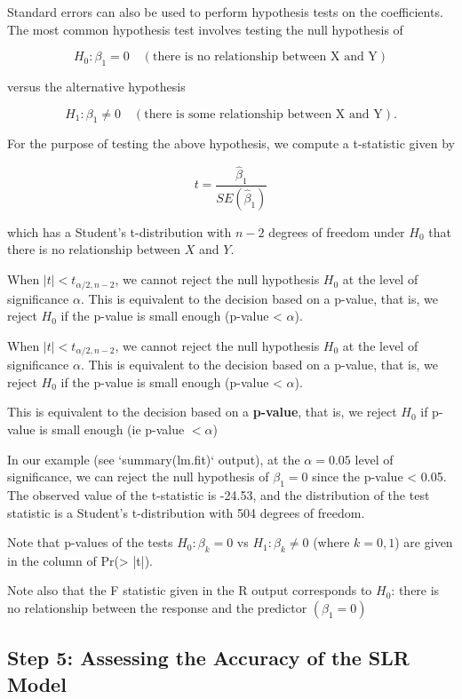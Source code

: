 \documentclass[11pt]{article}
\begin{document}
Standard errors can also be used to perform hypothesis tests on the coefficients. The most common hypothesis test involves testing the null hypothesis of

\[H_0: \beta_1 = 0 \quad (\text{there is no relationship between X and Y})\]

versus the alternative hypothesis

\[H_1: \beta_1 \neq 0 \quad (\text{there is some relationship between X and Y}).\]

For the purpose of testing the above hypothesis, we compute a t-statistic given by

\[t = \frac{\hat{\beta}_1}{SE(\hat{\beta}_1)}\]

which has a Student's t-distribution with \(n - 2\) degrees of freedom under \(H_0\) that there is no relationship between \(X\) and \(Y\).

When \(|t| < t_{\alpha/2,n-2}\), we cannot reject the null hypothesis \(H_0\) at the level of significance \(\alpha\). This is equivalent to the decision based on a p-value, that is, we reject \(H_0\) if the p-value is small enough (p-value < \(\alpha\)).

When \(|t| < t_{\alpha/2,n-2}\), we cannot reject the null hypothesis \(H_0\) at the level of significance \(\alpha\). This is equivalent to the decision based on a p-value, that is, we reject \(H_0\) if the p-value is small enough (p-value < \(\alpha\)).

This is equivalent to the decision based on a \textbf{p-value}, that is, we reject $H_0$ if p-value is small enough (ie p-value $< \alpha$)

In our example (see `summary(lm.fit)` output), at the \(\alpha = 0.05\) level of significance, we can reject the null hypothesis of \( \beta_1 = 0 \) since the p-value < 0.05. The observed value of the t-statistic is -24.53, and the distribution of the test statistic is a Student's t-distribution with 504 degrees of freedom.

Note that p-values of the tests \(H_0: \beta_k = 0\) vs \(H_1: \beta_k \neq 0\) (where \(k = 0, 1\)) are given in the column of Pr(> |t|).

Note also that the F statistic given in the R output corresponds to $H_0$: there is no relationship between the response and the predictor $(\beta_1 = 0)$

\subsection{Step 5: Assessing the Accuracy of the SLR Model}
\end{document}
